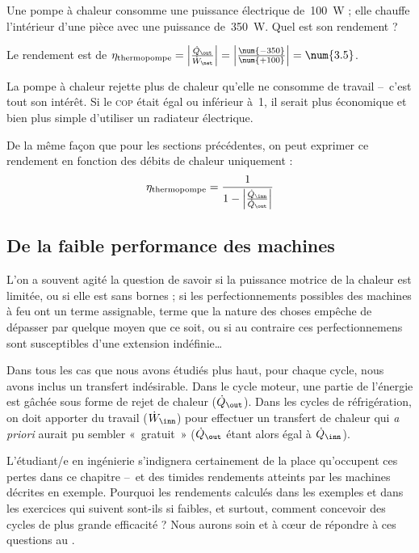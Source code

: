			\begin{anexample}
				Une pompe à chaleur consomme une puissance électrique de~\SI{100}{\watt} ; elle chauffe l’intérieur d’une pièce avec une puissance de~\SI{350}{\watt}. Quel est son rendement ?
		
				\begin{answer}
					Le rendement est de $\eta_\text{thermopompe} = \left| \frac{\dot Q_\out}{\dot W_\net} \right| = \left| \frac{\num{-350}}{\num{+100}} \right| = \num{3.5}$.
						\begin{remark} La pompe à chaleur rejette plus de chaleur qu’elle ne consomme de travail –\ c’est tout son intérêt. Si le \textsc{cop} était égal ou inférieur à~\num{1}, il serait plus économique et bien plus simple d’utiliser un radiateur électrique.\end{remark}
				\end{answer}
			\end{anexample}


		De la même façon que pour les sections précédentes, on peut exprimer ce rendement en fonction des débits de chaleur uniquement :
		\begin{equation}
			\eta_\text{thermopompe} = \frac{1}{1 - \left| \frac{\dot Q_\inn}{\dot Q_\out} \right|}
			\label{eq_rendement_thermopompe_qin_qout}
		\end{equation}



	\onlyframabook{\clearpage}
	\subsection{De la faible performance des machines}

			L’on a souvent agité la question de savoir si la puissance motrice de la chaleur est limitée, ou si elle est sans bornes ; si les perfectionnements possibles des machines à feu ont un terme assignable, terme que la nature des choses empêche de dépasser par quelque moyen que ce soit, ou si au contraire ces perfectionnemens sont susceptibles d’une extension indéfinie…

		Dans tous les cas que nous avons étudiés plus haut, pour chaque cycle, nous avons inclus un transfert indésirable. Dans le cycle moteur, une partie de l’énergie est gâchée sous forme de rejet de chaleur ($\dot Q_\out$). Dans les cycles de réfrigération, on doit apporter du travail ($\dot W_\inn$) pour effectuer un transfert de chaleur qui \textit{a priori} aurait pu sembler «~gratuit~» ($\dot Q_\out$ étant alors égal à $\dot Q_\inn$).

		L’étudiant/e en ingénierie s’indignera certainement de la place qu’occupent ces pertes dans ce chapitre --\ et des timides rendements atteints par les machines décrites en exemple. Pourquoi les rendements calculés dans les exemples et dans les exercices qui suivent sont-ils si faibles, et surtout, comment concevoir des cycles de plus grande efficacité ? Nous aurons soin et à cœur de répondre à ces questions au \courssept.
